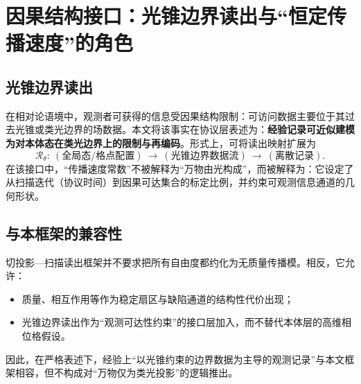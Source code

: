 \section{因果结构接口：光锥边界读出与“恒定传播速度”的角色}

\subsection{光锥边界读出}

在相对论语境中，观测者可获得的信息受因果结构限制：可访问数据主要位于其过去光锥或类光边界的场数据。本文将该事实在协议层表述为：\textbf{经验记录可近似建模为对本体态在类光边界上的限制与再编码}。形式上，可将读出映射扩展为
\[
\mathcal{R}_{\theta}:\ (\text{全局态/格点配置}) \ \longrightarrow\  (\text{光锥边界数据流})\ \longrightarrow\  (\text{离散记录}).
\]
在该接口中，“传播速度常数”不被解释为“万物由光构成”，而被解释为：它设定了从扫描迭代（协议时间）到因果可达集合的标定比例，并约束可观测信息通道的几何形状。

\subsection{与本框架的兼容性}

切投影—扫描读出框架并不要求把所有自由度都约化为无质量传播模。相反，它允许：
\begin{itemize}
  \item 质量、相互作用等作为稳定扇区与缺陷通道的结构性代价出现；
  \item 光锥边界读出作为“观测可达性约束”的接口层加入，而不替代本体层的高维相位格假设。
\end{itemize}
因此，在严格表述下，经验上“以光锥约束的边界数据为主导的观测记录”与本文框架相容，但不构成对“万物仅为类光投影”的逻辑推出。

